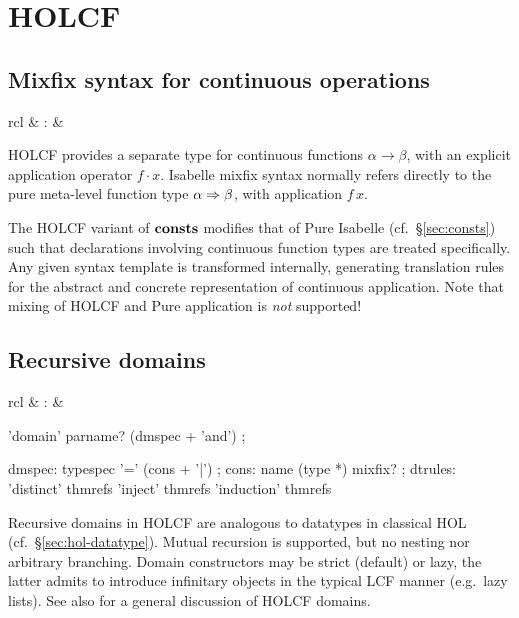 \section{HOLCF}

\subsection{Mixfix syntax for continuous operations}


\begin{matharray}{rcl}
   & : &  \\
\end{matharray}

HOLCF provides a separate type for continuous functions $\alpha \to
\beta$, with an explicit application operator $f \cdot x$.  Isabelle mixfix
syntax normally refers directly to the pure meta-level function type $\alpha
\Rightarrow \beta$, with application $f\,x$.

The HOLCF variant of ${\mathord{\mathbf{consts}}}$ modifies that of Pure Isabelle (cf.\ 
\S\ref{sec:consts}) such that declarations involving continuous function types
are treated specifically.  Any given syntax template is transformed
internally, generating translation rules for the abstract and concrete
representation of continuous application.  Note that mixing of HOLCF and Pure
application is \emph{not} supported!

\subsection{Recursive domains}

\begin{matharray}{rcl}
   & : &  \\
\end{matharray}

\begin{rail}
  'domain' parname? (dmspec + 'and')
  ;

  dmspec: typespec '=' (cons + '|')
  ;
  cons: name (type *) mixfix?
  ;
  dtrules: 'distinct' thmrefs 'inject' thmrefs 'induction' thmrefs
\end{rail}

Recursive domains in HOLCF are analogous to datatypes in classical HOL (cf.\ 
\S\ref{sec:hol-datatype}).  Mutual recursion is supported, but no nesting nor
arbitrary branching.  Domain constructors may be strict (default) or lazy, the
latter admits to introduce infinitary objects in the typical LCF manner (e.g.\ 
lazy lists).  See also \cite{MuellerNvOS99} for a general discussion of HOLCF
domains.


